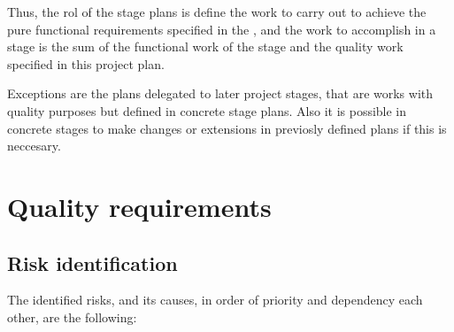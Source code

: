 \documentclass[twocolumn, 9pt]{extarticle}
\begin{document}
Thus, the rol of the stage plans is define the work to carry out to
achieve the pure functional requirements specified in the \favc, and
the work to accomplish in a stage is the sum of the functional work of
the stage and the quality work specified in this project plan.

Exceptions are the plans delegated to later project stages, that
are works with quality purposes but defined in concrete stage
plans. Also it is possible in concrete stages to make changes or
extensions in previosly defined plans if this is neccesary.


\section{Quality requirements}
\subsection{Risk identification}
The identified risks, and its causes, in order of priority and dependency
each other, are the following:
\end{document}
